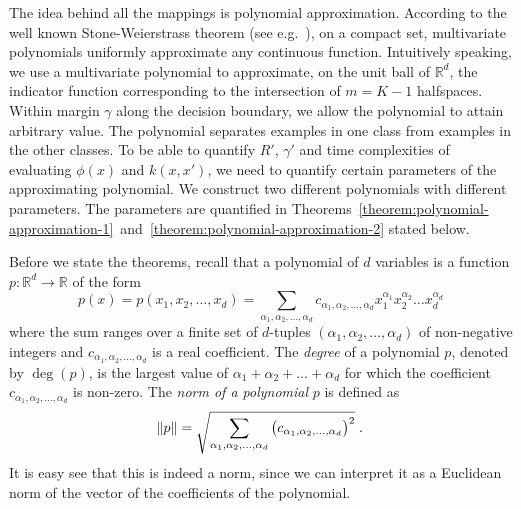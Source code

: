 \documentclass[12pt]{article}
\newcommand{\R}{\mathbb{R}}  %
\begin{document}
The idea behind all the mappings is polynomial approximation. According to the
well known Stone-Weierstrass theorem (see
e.g.~\citep[Section~10.10]{Davidson-Donsig-2010}), on a compact set,
multivariate polynomials uniformly approximate any continuous function.
Intuitively speaking, we use a multivariate polynomial to approximate, on the
unit ball of $\R^d$, the indicator function corresponding to the intersection of
$m=K-1$ halfspaces. Within margin $\gamma$ along the decision boundary, we allow
the polynomial to attain arbitrary value. The polynomial separates examples in
one class from examples in the other classes. To be able to quantify $R'$,
$\gamma'$ and time complexities of evaluating $\phi(x)$ and $k(x,x')$, we need
to quantify certain parameters of the approximating polynomial. We construct two
different polynomials with different parameters. The parameters are quantified
in
Theorems~\ref{theorem:polynomial-approximation-1}~and~\ref{theorem:polynomial-approximation-2}
stated below.

Before we state the theorems, recall that a polynomial of $d$ variables is a
function $p:\R^d \to \R$ of the form
$$
p(x) = p(x_1, x_2, \dots, x_d) = \sum_{\alpha_1, \alpha_2, \dots, \alpha_d} c_{\alpha_1, \alpha_2, \dots, \alpha_d} x_1^{\alpha_1} x_2^{\alpha_2} \dots x_d^{\alpha_d}
$$
where the sum ranges over a finite set of $d$-tuples $(\alpha_1, \alpha_2,
\dots, \alpha_d)$ of non-negative integers and $c_{\alpha_1, \alpha_2, \dots,
\alpha_d}$ is a real coefficient. The \emph{degree} of a polynomial $p$, denoted
by $\deg(p)$, is the largest value of $\alpha_1 + \alpha_2 + \dots + \alpha_d$
for which the coefficient $c_{\alpha_1, \alpha_2, \dots, \alpha_d}$ is non-zero.
The \emph{norm of a polynomial} $p$ is defined as
$$
\norm{p} = \sqrt{\sum_{\alpha_1, \alpha_2, \dots, \alpha_d} \left(c_{\alpha_1, \alpha_2, \dots, \alpha_d} \right)^2 } \; .
$$
It is easy see that this is indeed a norm, since we can interpret it as a
Euclidean norm of the vector of the coefficients of the polynomial.
\end{document}
